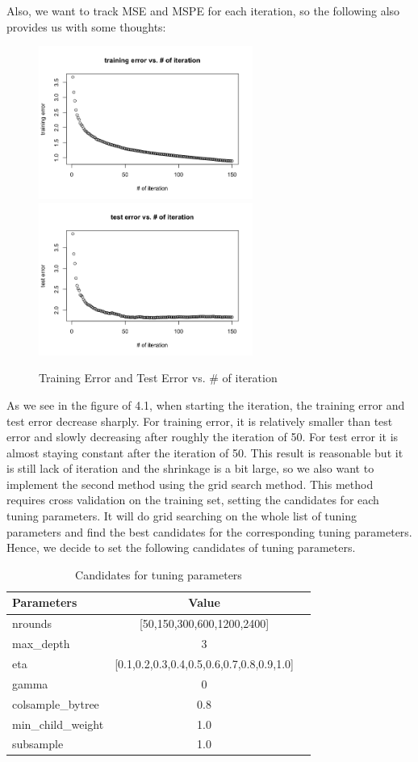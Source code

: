 \documentclass[11pt]{article}
\begin{document}
\noindent Also, we want to track MSE and MSPE for each iteration, so the following also provides us with some thoughts:\\
\begin{figure}[h]
\centering
\includegraphics[height=5cm]{xgb1trainingErr}\quad
\includegraphics[height=5cm]{xgb1TestErr}\caption{Training Error and Test Error vs. \# of iteration}
\end{figure}

\noindent As we see in the figure of 4.1, when starting the iteration, the training error and test error decrease sharply. For training error, it is relatively smaller than test error and slowly decreasing after roughly the iteration of 50. For test error it is almost staying constant after the iteration of 50. This result is reasonable but it is still lack of iteration and the shrinkage is a bit large, so we also want to implement the second method using the grid search method. This method requires cross validation on the training set, setting the candidates for each tuning parameters. It will do grid searching on the whole list of tuning parameters and find the best candidates for the corresponding tuning parameters. Hence, we decide to set the following candidates of tuning parameters.\\

\begin{table}[h]
    \label{default_model}
    \centering
    \begin{tabular}{l c c}
        \hline
        \textbf{Parameters} & \textbf{Value} \\ \hline
        nrounds & [50,150,300,600,1200,2400] \\
        max\_depth & 3 \\
        eta & [0.1,0.2,0.3,0.4,0.5,0.6,0.7,0.8,0.9,1.0]\\
        gamma & 0\\
        colsample\_bytree & 0.8\\
        min\_child\_weight & 1.0\\
        subsample & 1.0\\
        \hline
    \end{tabular}
    \caption{Candidates for tuning parameters}
\end{table}
\end{document}
